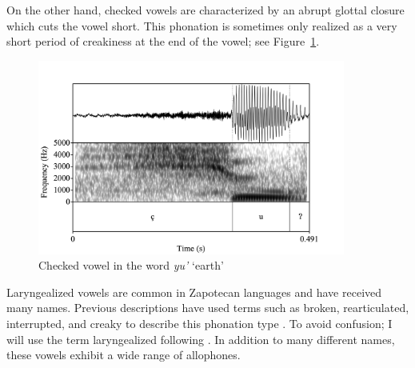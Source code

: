 \documentclass[12pt, letterpaper]{article}
\begin{document}
On the other hand, checked vowels are characterized by an abrupt glottal closure which cuts the vowel short. This phonation is sometimes only realized as a very short period of creakiness at the end of the vowel; see Figure~\ref{fig:CheckedVowel}.  

\begin{figure}[!h]
	\centering
	\includegraphics[width=0.9\textwidth]{Images/RD_yu'.png}
	\caption{Checked vowel in the word \textit{yu'} `earth'}
	\label{fig:CheckedVowel}
\end{figure}

Laryngealized vowels are common in Zapotecan languages and have received many names. Previous descriptions have used terms such as broken, rearticulated, interrupted, and creaky to describe this phonation type \citep{longDiccionarioZapotecoSan2005,avelinobecerraTopicsYalalagZapotec2004,avelinoAcousticElectroglottographicAnalyses2010,sonnenscheinDescriptiveGrammarSan2005,adlerAcousticsPhonationTypes2016}. To avoid confusion; I will use the term laryngealized following \citet{avelinoAcousticElectroglottographicAnalyses2010}. In addition to many different names, these vowels exhibit a wide range of allophones. 
\end{document}
